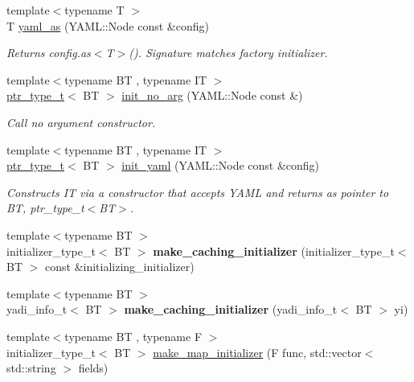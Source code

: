 \begin{DoxyCompactItemize}
{\footnotesize template$<$typename T $>$ }\\T \hyperlink{namespaceyadi_a8552ed4e9350993901558fb0db1e0906}{yaml\+\_\+as} (Y\+A\+M\+L\+::\+Node const \&config)
\begin{DoxyCompactList}\small\item\em Returns config.\+as$<$\+T$>$(). Signature matches factory initializer. \end{DoxyCompactList}\item 
{\footnotesize template$<$typename BT , typename IT $>$ }\\\hyperlink{namespaceyadi_a92290eb27cd90666aa87b17d854af9fe}{ptr\+\_\+type\+\_\+t}$<$ BT $>$ \hyperlink{namespaceyadi_a29e6a880477f8ed0163fbfc66aa6e5ba}{init\+\_\+no\+\_\+arg} (Y\+A\+M\+L\+::\+Node const \&)
\begin{DoxyCompactList}\small\item\em Call no argument constructor. \end{DoxyCompactList}\item 
{\footnotesize template$<$typename BT , typename IT $>$ }\\\hyperlink{namespaceyadi_a92290eb27cd90666aa87b17d854af9fe}{ptr\+\_\+type\+\_\+t}$<$ BT $>$ \hyperlink{namespaceyadi_afde7bc09c5c23344ded1f10f21386272}{init\+\_\+yaml} (Y\+A\+M\+L\+::\+Node const \&config)
\begin{DoxyCompactList}\small\item\em Constructs IT via a constructor that accepts Y\+A\+ML and returns as pointer to BT, ptr\+\_\+type\+\_\+t$<$\+B\+T$>$. \end{DoxyCompactList}\item 
\mbox{\label{namespaceyadi_a97efcea8efe1e35d98961c88e21d5b31}} 
{\footnotesize template$<$typename BT $>$ }\\initializer\+\_\+type\+\_\+t$<$ BT $>$ {\bfseries make\+\_\+caching\+\_\+initializer} (initializer\+\_\+type\+\_\+t$<$ BT $>$ const \&initializing\+\_\+initializer)
\item 
\mbox{\label{namespaceyadi_a71eac695c975b9f2b7f9d9611725b94e}} 
{\footnotesize template$<$typename BT $>$ }\\yadi\+\_\+info\+\_\+t$<$ BT $>$ {\bfseries make\+\_\+caching\+\_\+initializer} (yadi\+\_\+info\+\_\+t$<$ BT $>$ yi)
\item 
{\footnotesize template$<$typename BT , typename F $>$ }\\initializer\+\_\+type\+\_\+t$<$ BT $>$ \hyperlink{namespaceyadi_a904dc2ee15dbdedd1b2dac4e0420fe15}{make\+\_\+map\+\_\+initializer} (F func, std\+::vector$<$ std\+::string $>$ fields)

\end{DoxyCompactItemize}
